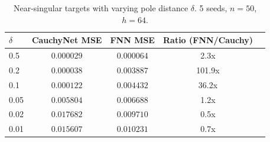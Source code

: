 \begin{table}[ht]\centering
\caption{Near-singular targets with varying pole distance $\delta$. 5 seeds, $n=50$, $h=64$.}
\label{tab:delta_sweep}
\begin{tabular}{lcccc}
\toprule
$\delta$ & CauchyNet MSE & FNN MSE & Ratio (FNN/Cauchy) \\
\midrule
0.5 & $0.000029$ & $0.000064$ & 2.3x \\
0.2 & $0.000038$ & $0.003887$ & 101.9x \\
0.1 & $0.000122$ & $0.004432$ & 36.2x \\
0.05 & $0.005804$ & $0.006688$ & 1.2x \\
0.02 & $0.017682$ & $0.009710$ & 0.5x \\
0.01 & $0.015607$ & $0.010231$ & 0.7x \\
\bottomrule
\end{tabular}
\end{table}
